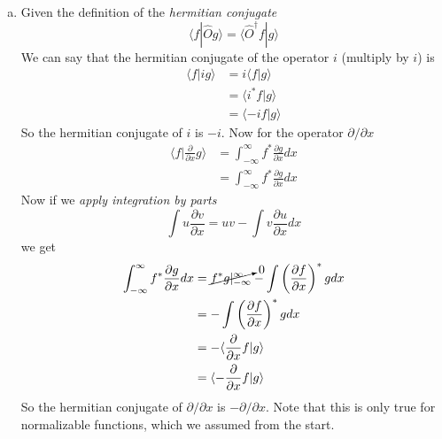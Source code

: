 \documentclass[11pt]{article}
\numberwithin{equation}{section}
\newcommand{\norm}[2]{\langle{#1}|{#2}\rangle}
\begin{document}
\begin{enumerate}[(a)]
\item
Given the definition of the \emph{hermitian conjugate}
\begin{equation}
\norm{f}{\hat{O}g} = \norm{\hat{O}^{\dagger}f}{g}
\label{hermcon}
\end{equation}
We can say that the hermitian conjugate of the operator $i$ (multiply by $i$) is
\begin{align*}
\norm{f}{ig} &= i\norm{f}{g}\\
&= \norm{i^*f}{g}\\
&= \norm{-if}{g}
\end{align*}
So the hermitian conjugate of $i$ is $-i$. Now for the operator $\partial/\partial x$
\begin{align*}
\norm{f}{\frac{\partial}{\partial x}g} &= \int_{-\infty}^{\infty} f^*\frac{\partial g}{\partial x}dx\\
&= \int_{-\infty}^{\infty} f^*\frac{\partial g}{\partial x}dx
\end{align*}
Now if we \emph{apply integration by parts}
\begin{equation}
\int u\frac{\partial v}{\partial x} = uv - \int v\frac{\partial u}{\partial x}dx
\label{IntPart}
\end{equation}
we get
\begin{align*}
\int_{-\infty}^{\infty} f^*\frac{\partial g}{\partial x}dx &= \cancelto{0}{f^*g|_{-\infty}^{\infty}} - \int \left(\frac{\partial f}{\partial x}\right)^*gdx\\
&=  -\int \left(\frac{\partial f}{\partial x}\right)^*gdx\\
&= -\norm{\frac{\partial}{\partial x}f}{g}\\
&= \norm{-\frac{\partial}{\partial x}f}{g}
\end{align*}
So the hermitian conjugate of $\partial/\partial x$ is $-\partial/\partial x$. Note that this is only true for normalizable functions, which we assumed from the start.


\end{enumerate}
\end{document}
